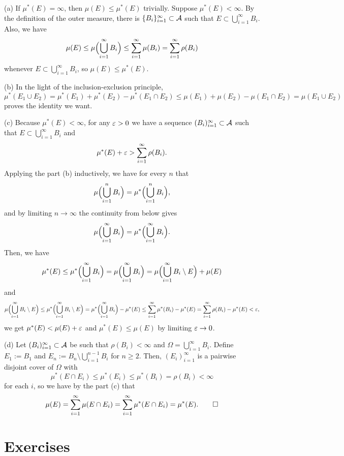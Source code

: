 \documentclass{../../large}
\begin{document}
\begin{pf}
(a)
If $\mu^*(E)=\infty$, then $\mu(E)\le\mu^*(E)$ trivially.
Suppose $\mu^*(E)<\infty$.
By the definition of the outer measure, there is $\{B_i\}_{i=1}^\infty\subset\mathcal{A}$ such that $E\subset\bigcup_{i=1}^\infty B_i$.
Also, we have
\[\mu(E)\le\mu\Bigl(\bigcup_{i=1}^\infty B_i\Bigr)\le\sum_{i=1}^\infty\mu(B_i)=\sum_{i=1}^\infty\rho(B_i)\]
whenever $E\subset\bigcup_{i=1}^\infty B_i$, so $\mu(E)\le\mu^*(E)$.

(b)
In the light of the inclusion-exclusion principle,
\[\mu^*(E_1\cup E_2)=\mu^*(E_1)+\mu^*(E_2)-\mu^*(E_1\cap E_2)\le\mu(E_1)+\mu(E_2)-\mu(E_1\cap E_2)=\mu(E_1\cup E_2)\]
proves the identity we want.

(c)
Because $\mu^*(E)<\infty$, for any $\varepsilon>0$ we have a sequence $(B_i)_{i=1}^\infty\subset\mathcal{A}$ such that $E\subset\bigcup_{i=1}^\infty B_i$ and
\[\mu^*(E)+\varepsilon>\sum_{i=1}^\infty\rho(B_i).\]
Applying the part (b) inductively, we have for every $n$ that
\[\mu\Bigl(\bigcup_{i=1}^nB_i\Bigr)=\mu^*\Bigl(\bigcup_{i=1}^nB_i\Bigr),\]
and by limiting $n\to\infty$ the continuity from below gives
\[\mu\Bigl(\bigcup_{i=1}^\infty B_i\Bigr)=\mu^*\Bigl(\bigcup_{i=1}^\infty B_i\Bigr).\]
Then, we have
\[\mu^*(E)\le\mu^*\Bigl(\bigcup_{i=1}^\infty B_i\Bigr)=\mu\Bigl(\bigcup_{i=1}^\infty B_i\Bigr)=\mu\Bigl(\bigcup_{i=1}^\infty B_i\setminus E\Bigr)+\mu(E)\]
and
\[\mu\Bigl(\bigcup_{i=1}^\infty B_i\setminus E\Bigr)\le\mu^*\Bigl(\bigcup_{i=1}^\infty B_i\setminus E\Bigr)=\mu^*\Bigl(\bigcup_{i=1}^\infty B_i\Bigr)-\mu^*(E)\le\sum_{i=1}^\infty\mu^*(B_i)-\mu^*(E)=\sum_{i=1}^\infty\rho(B_i)-\mu^*(E)<\varepsilon,\]
we get $\mu^*(E)<\mu(E)+\varepsilon$ and $\mu^*(E)\le\mu(E)$ by limiting $\varepsilon\to0$.

(d)
Let $(B_i)_{i=1}^\infty\subset\mathcal{A}$ be such that $\rho(B_i)<\infty$ and $\Omega=\bigcup_{i=1}^\infty B_i$.
Define $E_1:=B_1$ and $E_n:=B_n\setminus\bigcup_{i=1}^{n-1}B_i$ for $n\ge2$.
Then, $(E_i)_{i=1}^\infty$ is a pairwise disjoint cover of $\Omega$ with
\[\mu^*(E\cap E_i)\le\mu^*(E_i)\le\mu^*(B_i)=\rho(B_i)<\infty\]
for each $i$, so we have by the part (c) that
\[\mu(E)=\sum_{i=1}^\infty\mu(E\cap E_i)=\sum_{i=1}^\infty\mu^*(E\cap E_i)=\mu^*(E).\qedhere\]
\end{pf}


\section*{Exercises}
\end{document}
